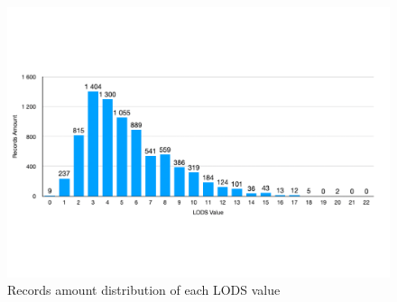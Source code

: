 \documentclass[12pt,a4paper,english
]{tunithesis}
\begin{document}
\begin{figure}[t]
  \begin{center}
    \includegraphics[width=1.0\textwidth]{thesis/img/lods_record_distribution.pdf}
  \end{center}
  \caption[Record amount of each lods value]{Records amount distribution of each LODS value}
  \label{fig:lods_distri_fig}
\end{figure}
\end{document}
